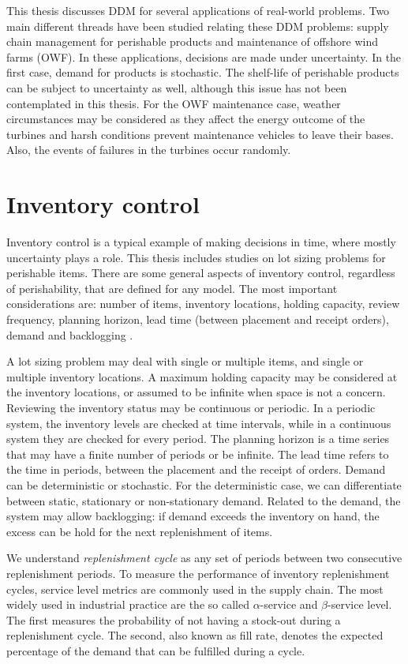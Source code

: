 This thesis discusses DDM for several applications of real-world problems. Two main different threads have been studied relating these DDM problems: supply chain management for perishable products and maintenance of offshore wind farms (OWF). In these applications, decisions are made  under uncertainty. In the first case, demand for products is stochastic. The shelf-life of perishable products can be subject to uncertainty as well, although this issue has not been contemplated in this thesis. For the OWF maintenance case, weather circumstances may be considered as they affect the energy outcome of the turbines and harsh conditions prevent maintenance vehicles to leave their bases. Also, the events of failures in the turbines occur randomly.

\label{sec:backgrounddynamic}
\section{Inventory control}
\label{sec:inventorycontrol}
Inventory control is a typical example of making decisions in time, where mostly uncertainty plays a role. This thesis includes studies on lot sizing problems for perishable items. There are some general aspects of inventory control, regardless of perishability, that are defined for any model. The most important considerations are: number of items, inventory locations, holding capacity, review frequency, planning horizon, lead time (between placement and receipt orders), demand and backlogging \cite{Silver98}.

A lot sizing problem may deal with single or multiple items, and single or multiple inventory locations. A maximum holding capacity may be considered at the inventory locations, or assumed to be infinite when space is not a concern. Reviewing the inventory status may be continuous or periodic. In a periodic system, the inventory levels are checked at time intervals, while in a continuous system they are checked for every period. The planning horizon is a time series that may have a finite number of periods or be infinite. The lead time refers to the time in periods, between the placement and the receipt of orders. Demand can be deterministic or stochastic. For the deterministic case, we can differentiate between static, stationary or non-stationary demand. Related to the demand, the system may allow backlogging: if demand exceeds the inventory on hand, the excess can be hold for the next replenishment of items.

We understand \emph{replenishment cycle} as any set of periods between two consecutive replenishment periods. To measure the performance of inventory replenishment cycles, service level metrics are commonly used in the supply chain. The most widely used in industrial practice are the so called $\alpha$-service and $\beta$-service level. The first measures the probability of not having a stock-out during a replenishment cycle. The second, also known as fill rate, denotes the expected percentage of the demand that can be fulfilled during a cycle.



